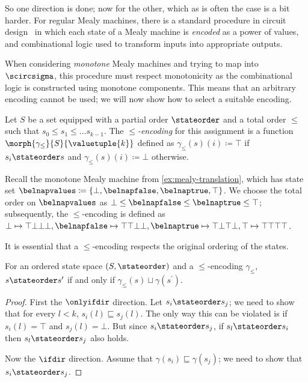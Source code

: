So one direction is done; now for the other, which as is often the case is
a bit harder.
For regular Mealy machines, there is a standard procedure in circuit
design~\cite{kohavi2009switching} in which each state of a Mealy machine is
\emph{encoded} as a power of values, and combinational logic used to transform
inputs into appropriate outputs.

\begin{example}
\end{example}

When considering \emph{monotone} Mealy machines and trying to map into
\(\scircsigma\), this procedure must respect monotonicity as the combinational
logic is constructed using monotone components.
This means that an arbitrary encoding cannot be used; we will now show how to
select a suitable encoding.

\begin{definition}
    Let \(S\) be a set equipped with a partial order \(\stateorder\) and a total
    order \(\leq\) such that \(s_0 \leq s_1 \leq \dots s_{k-1}\).
    The \emph{\(\leq\)-encoding} for this assignment is a function
    \(\morph{\gamma_\leq}{S}{\valuetuple{k}}\) defined as
    \(\gamma_\leq(s)(i) \coloneqq \top\) if \(s_i \stateorder s\) and
    \(\gamma_\leq(s)(i) \coloneqq \bot\) otherwise.
\end{definition}

\begin{example}
    Recall the monotone Mealy machine from \cref{ex:mealy-translation}, which
    has state set \(
        \belnapvalues \coloneqq \{\bot,\belnapfalse,\belnaptrue,\top\}
    \).
    We choose the total order on \(\belnapvalues\) as
    \(\bot \leq \belnapfalse \leq \belnaptrue \leq \top\); subsequently, the
    \(\leq\)-encoding is defined as \(
        \bot \mapsto \top\bot\bot\bot, \belnapfalse \mapsto \top\top\bot\bot,
        \belnaptrue \mapsto \top\bot\top\bot, \top \mapsto \top\top\top\top
    \).
\end{example}

It is essential that a \(\leq\)-encoding respects the original ordering of the
states.

\begin{lemma}
    For an ordered state space \((S,\stateorder)\) and a \(\leq\)-encoding
    \(\gamma_\leq\), \(s \stateorder s^\prime\) if and only if
    \(\gamma_\leq(s) \sqcup \gamma(s^\prime)\).
\end{lemma}
\begin{proof}
    First the \(\onlyifdir\) direction.
    Let \(s_i \stateorder s_j\); we need to show that for every \(l < k\),
    \(s_i(l) \sqsubseteq s_j(l)\).
    The only way this can be violated is if \(s_i(l) = \top\) and
    \(s_j(l) = \bot\).
    But since \(s_i \stateorder s_j\), if \(s_l \stateorder s_i\) then
    \(s_l \stateorder s_j\) also holds.

    Now the \(\ifdir\) direction.
    Assume that \(\gamma(s_i) \sqsubseteq \gamma(s_j)\); we need to show that
    \(s_i \stateorder s_j\).
\end{proof}